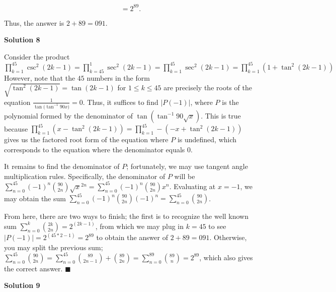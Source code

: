 \begin{enumerate}
 \[= 2^{89}.\]

 Thus, the answer is $2+89 = \boxed{091}.$




\textbf{Solution 8}

Consider the product $\prod_{k=1}^{45} \csc^2(2k-1) = \prod_{k=45}^{1} \sec^2(2k-1) = \prod_{k=1}^{45} \sec^2(2k-1) =  \prod_{k=1}^{45} (1+\tan^2(2k-1))$ However, note that the $45$ numbers in the form $\sqrt{\tan^2(2k-1)} = \tan(2k-1)$ for $1\le{k}\le{45}$ are precisely the roots of the equation $\frac{1}{\tan{(\tan^{-1}{90x}})} = 0$. Thus, it suffices to find $|P(-1)|$, where $P$ is the polynomial formed by the denominator of $\tan{(\tan^{-1}{90\sqrt{x}})}$. This is true because $\prod_{k=1}^{45} (x-\tan^2(2k-1)) = \prod_{k=1}^{45} -(-x+\tan^2(2k-1))$ gives us the factored root form of the equation where $P$ is undefined, which corresponds to the equation where the denominator equals $0$. 

 It remains to find the denominator of $P$; fortunately, we may use tangent angle multiplication rules. Specifically, the denominator of $P$ will be $\sum_{n=0} ^{45} (-1)^n\binom{90}{2n}\sqrt{x}^{2n} = \sum_{n=0} ^{45} (-1)^n\binom{90}{2n}x^n$. Evaluating at $x = -1$, we may obtain the sum $\sum_{n=0} ^{45} (-1)^n\binom{90}{2n}(-1)^{n} = \sum_{n=0} ^{45} \binom{90}{2n}$. 

 From here, there are two ways to finish; the first is to recognize the well known sum $\sum_{n=0} ^{k} \binom{2k}{2n} = 2^(2k-1)$, from which we may plug in $k = 45$ to see $|P(-1)| = 2^(45*2-1) = 2^{89}$ to obtain the answer of $2+89=\boxed{091}$. Otherwise, you may split the previous sum; $\sum_{n=0} ^{45} \binom{90}{2n} = \sum_{n=0} ^{45} \binom{89}{2n-1} + \binom{89}{2n} = \sum_{n=0} ^{89} \binom{89}{n} = 2^{89}$, which also gives the correct answer. $\blacksquare$




\textbf{Solution 9}


\end{enumerate}
